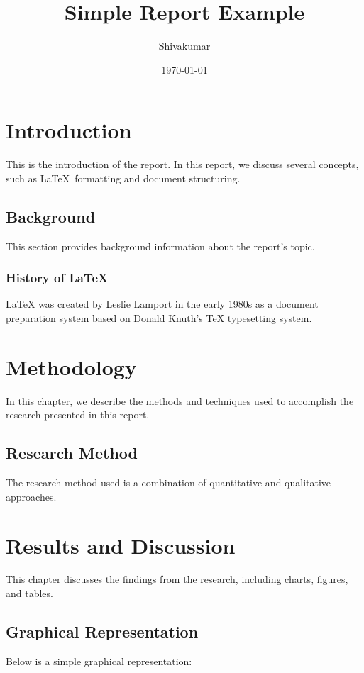 \documentclass[a4paper, 12pt]{report} %
\title{Simple Report Example}
\author{Shivakumar} %
\date{\today} %
\begin{document}
\maketitle %

\tableofcontents %

\chapter{Introduction} %
This is the introduction of the report. In this report, we discuss several concepts, such as \LaTeX\ formatting and document structuring.

\section{Background} %
This section provides background information about the report's topic.

\subsection{History of LaTeX} %
LaTeX was created by Leslie Lamport in the early 1980s as a document preparation system based on Donald Knuth's TeX typesetting system.

\chapter{Methodology} %
In this chapter, we describe the methods and techniques used to accomplish the research presented in this report.

\section{Research Method} %
The research method used is a combination of quantitative and qualitative approaches.

\chapter{Results and Discussion} %
This chapter discusses the findings from the research, including charts, figures, and tables.

\section{Graphical Representation} %
Below is a simple graphical representation:
\end{document}
